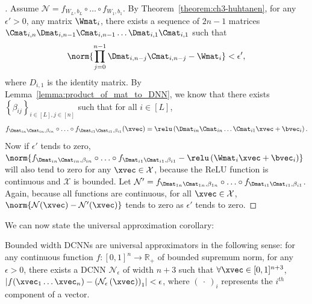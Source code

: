 \begin{proof}[]
Assume $\mathcal{N}=f_{W_{L},b_{L}} \circ \ldots \circ f_{W_{1},b_{1}}$.
By Theorem~\ref{theorem:ch3-huhtanen}, for any $\epsilon '> 0$, any matrix $\Wmat_{i}$, there exists a sequence of $2n-1$ matrices $\Cmat_{i,n} \Dmat_{i,n-1} \Cmat_{i,n-1} \ldots \Dmat_{i,1} \Cmat_{i,1}$ such that 
\begin{equation}
  \norm{\prod_{j=0}^{n-1} \Dmat_{i,n-j} \Cmat_{i,n-j} - \Wmat_{i}} < \epsilon' , 
\end{equation}
where $D_{i,1}$ is the identity matrix.
By Lemma~\ref{lemma:product_of_mat_to_DNN}, we know that there exists $\left\{ \beta_{ij} \right\}_{i \in[L], j \in [n]}$ such that for all $i\in[L]$, 
\begin{equation}
  f_{\Dmat_{in} \Cmat_{in},\beta_{in}} \circ \ldots \circ f_{\Dmat_{i1} \Cmat_{i1}, \beta_{i1}}(\xvec) = \relu \left(\Dmat_{in}\Cmat_{in} \ldots \Cmat_{i1} \xvec + \bvec_{i} \right).
\end{equation}
Now if $\epsilon'$ tends to zero, $\norm{ f_{\Dmat_{in} \Cmat_{in},\beta_{in}} \circ \ldots \circ f_{\Dmat_{i1}\Cmat_{i1},\beta_{i1}} - \relu \left(\Wmat_{i}\xvec+\bvec_{i}\right)}$ will also tend to zero for any $\xvec \in \mathcal{X}$, because the ReLU function is continuous and $\mathcal{X}$ is bounded.
Let $\mathcal{N}' = f_{\Dmat_{1n} \Cmat_{1n},\beta_{1n}} \circ \ldots \circ f_{\Dmat_{i1}\Cmat_{i1},\beta_{i1}}$.
Again, because all functions are continuous, for all $\xvec \in \mathcal{X}$, $\norm{ \mathcal{N}(\xvec)-\mathcal{N}'(\xvec)} $ tends to zero as $\epsilon'$ tends to zero.
\end{proof}




We can now state the universal approximation corollary:

\begin{corollary} \label{corollary:universal}
Bounded width DCNNs are universal approximators in the following sense: for any continuous function $f:[0,1]^{n}\rightarrow\mathbb{R}_+$ of bounded supremum norm, for any $\epsilon > 0$, there exists a DCNN $\mathcal{N}_{\epsilon}$ of width $n+3$ such that $\forall \xvec \in [0,1]^{n+3}$, $\left| f(\xvec_{1} \ldots \xvec_{n}) - \left( \mathcal{N}_{\epsilon} \left( \xvec \right) \right)_{1} \right| < \epsilon$, where $\left(\ \cdot\ \right)_{i}$ represents the $i^{th}$ component of a vector.
\end{corollary}


